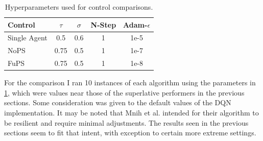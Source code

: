 \documentclass[12pt,letterpaper]{exam}
\begin{document}
\begin{questions}
    \begin{table}[h]
        \centering
        \begin{tabular}{l cccc}
            Control & \(\tau\) & \(\sigma\) & N-Step & Adam-\(\epsilon\) \\
            \midrule
            Single Agent & 0.5 & 0.6 & 1 & 1e-5\\
            NoPS & 0.75 & 0.5 & 1 & 1e-7 \\
            FuPS & 0.75 & 0.5 & 1 & 1e-8 \\
        \end{tabular}
        \caption{Hyperparameters used for control comparisons.}
        \label{tab:comp_parameters}
    \end{table}

For the comparison I ran 10 instances of each algorithm using the 
parameters in \cref{tab:comp_parameters}, which were values near 
those of the superlative performers in the previous sections.
Some consideration was given to the default values of the DQN implementation. 
It may be noted that Mnih et al. \cite{mnih2015} intended for their algorithm 
to be resilient and require minimal adjustments.
The results seen in the previous sections seem to fit that intent,
with exception to certain more extreme settings.


\end{questions}
\end{document}
